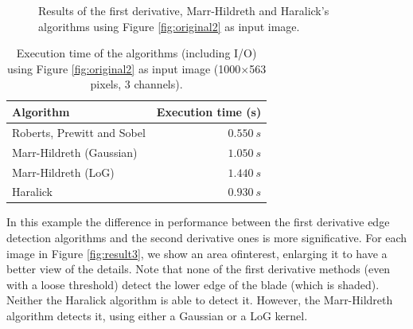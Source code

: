 \documentclass{ipol}
\numberwithin{equation}{section}
\numberwithin{table}{section}
\begin{document}
{\begin{figure}[h!]
	\quad
	\caption{Results of the first derivative, Marr-Hildreth and Haralick's algorithms using Figure \ref{fig:original2} as input image.}
	\label{fig:result2}
\end{figure}

\begin{table}[t!]
	\begin{center}
	\begin{tabular}{| l | r |}
		\hline \rule{0pt}{3ex}
		\cellcolor[gray]{0.8} \textbf{Algorithm}	& \cellcolor[gray]{0.8} \textbf{Execution time (s)}	\\ \hline \rule{0pt}{3ex}
		Roberts, Prewitt and Sobel					& $0.550 \ s$										\\ \hline \rule{0pt}{3ex}
		Marr-Hildreth (Gaussian)					& $1.050 \ s$										\\ \hline \rule{0pt}{3ex}
		Marr-Hildreth (LoG)							& $1.440 \ s$										\\ \hline \rule{0pt}{3ex}
		Haralick									& $0.930 \ s$										\\
		\hline
	\end{tabular}
	\end{center}
	\caption{Execution time of the algorithms (including I/O) using Figure \ref{fig:original2} as input image (1000$\times$563 pixels, 3 channels).}
	\label{exectime2}
\end{table}

In this example the difference in performance between the first derivative edge detection algorithms and the second derivative ones is more significative.  For each image in Figure \ref{fig:result3}, we show an area of ​​interest, enlarging it to have a better view of the details. Note that none of the first derivative methods (even with a loose threshold) detect the lower edge of the blade (which is shaded). Neither the Haralick algorithm is able to detect it. However, the Marr-Hildreth algorithm detects it, using either a Gaussian or a LoG kernel. 

}
\end{document}
